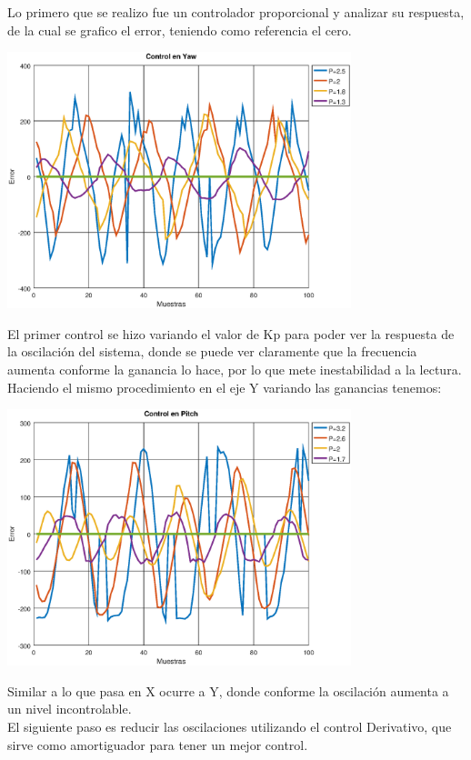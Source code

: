 Lo primero que se realizo fue un controlador proporcional y analizar su respuesta, de la cual se grafico el error, teniendo como
referencia el cero.
\begin{center}
	\includegraphics[width=0.75\textwidth]{Contenido/Cuerpo/Capitulo5/Fig8.eps}
	\label{Fig4}
\end{center}
El primer control se hizo variando el valor de Kp para poder ver la respuesta de la oscilación del sistema, donde se puede ver claramente que la
frecuencia aumenta conforme la ganancia lo hace, por lo que mete inestabilidad a la lectura.\\
Haciendo el mismo procedimiento en el eje Y variando las ganancias tenemos:
\begin{center}
	\includegraphics[width=0.75\textwidth]{Contenido/Cuerpo/Capitulo5/Fig9.eps}
	\label{Fig4}
\end{center}
Similar a lo que pasa en X ocurre a Y, donde conforme la oscilación aumenta a un nivel incontrolable.\\
El siguiente paso es reducir las oscilaciones utilizando el control Derivativo, que sirve como amortiguador para tener un mejor control.
